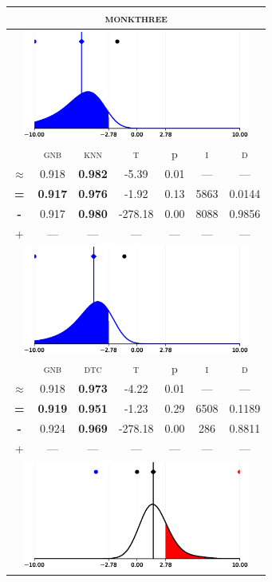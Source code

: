\begin{tabular}{c||cc||c|c|c||c}
	\toprule
	\multicolumn{7}{c}{\textsc{monkthree}}\\
	\bottomrule
	\multicolumn{7}{c}{\includegraphics[width=7.5cm, trim=30 0 30 0]{figures/monkthree_0.eps}}\\

\midrule	&\textsc{gnb} & \textsc{knn} & \textsc{t} & p & \textsc{i} & \textsc{d}\\
	\color{blue} $\approx$ & \color{blue}  0.918 &\color{blue}  \bfseries 0.982 & -5.39 & 0.01 & --- & ---\\\midrule
	{\bfseries\color{black}\tiny=}& \color{black} \bfseries 0.917 & \color{black} \bfseries 0.976 & -1.92 & 0.13 & 5863 & \color{black} 0.0144\\
	{\bfseries\color{blue}\tiny-}& \color{blue}  0.917 & \color{blue} \bfseries 0.980 & -278.18 & 0.00 & 8088 & \color{blue} 0.9856\\
	{\tiny+}& --- & --- & --- & --- & --- & ---\\
	\bottomrule
	\multicolumn{7}{c}{\includegraphics[width=7.5cm, trim=30 0 30 0]{figures/monkthree_1.eps}}\\

\midrule	&\textsc{gnb} & \textsc{dtc} & \textsc{t} & p & \textsc{i} & \textsc{d}\\
	\color{blue} $\approx$ & \color{blue}  0.918 &\color{blue}  \bfseries 0.973 & -4.22 & 0.01 & --- & ---\\\midrule
	{\bfseries\color{black}\tiny=}& \color{black} \bfseries 0.919 & \color{black} \bfseries 0.951 & -1.23 & 0.29 & 6508 & \color{black} 0.1189\\
	{\bfseries\color{blue}\tiny-}& \color{blue}  0.924 & \color{blue} \bfseries 0.969 & -278.18 & 0.00 & 286 & \color{blue} 0.8811\\
	{\tiny+}& --- & --- & --- & --- & --- & ---\\
	\bottomrule
	\multicolumn{7}{c}{\includegraphics[width=7.5cm, trim=30 0 30 0]{figures/monkthree_2.eps}}\\


\end{tabular}

